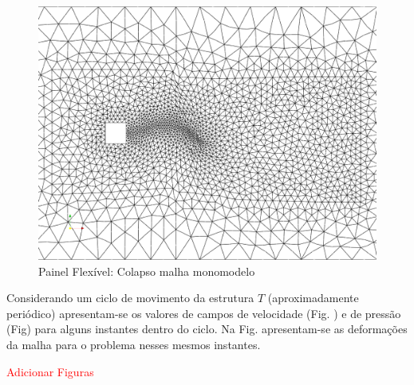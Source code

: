 \documentclass[tese_patricia]{subfiles}
\begin{document}
\begin{figure}[htb!]
	\centering 
	\includegraphics[scale=0.25,trim=0cm 0cm 0cm 0cm, clip=true]{Imagens/Cap7/deformadaMonomodelo.pdf}	
	\caption{Painel Flexível: Colapso malha monomodelo}
	\label{fig:Painel:ColapsoMono}
\end{figure}

Considerando um ciclo de movimento da estrutura $T$ (aproximadamente periódico) apresentam-se os valores de campos de velocidade (Fig. ) e de pressão (Fig) para alguns instantes dentro do ciclo. Na Fig. apresentam-se as deformações da malha para o problema nesses mesmos instantes.

\textcolor{red}{Adicionar Figuras}
	
\end{document}
